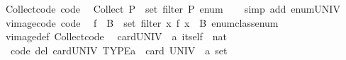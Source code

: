 \begin{isabellebody}
{}
\isamarkuptrue%
%
\isamarkuptrue%
%
\endisatagdocument
{\isafolddocument}%
%
\isadelimdocument
%
\endisadelimdocument
{}\isamarkupfalse%
\ Collect{\isacharunderscore}{\kern0pt}code\ {\isacharbrackleft}{\kern0pt}code{\isacharbrackright}{\kern0pt}{\isacharcolon}{\kern0pt}\isanewline
\ \ {\isachardoublequoteopen}Collect\ P\ {\isacharequal}{\kern0pt}\ set\ {\isacharparenleft}{\kern0pt}filter\ P\ enum{\isacharparenright}{\kern0pt}{\isachardoublequoteclose}\isanewline
%
\isadelimproof
\ \ %
\endisadelimproof
%
\isatagproof
{}\isamarkupfalse%
\ {\isacharparenleft}{\kern0pt}simp\ add{\isacharcolon}{\kern0pt}\ enum{\isacharunderscore}{\kern0pt}UNIV{\isacharparenright}{\kern0pt}%
\endisatagproof
{\isafoldproof}%
%
\isadelimproof
\isanewline
%
\endisadelimproof
\isanewline
{}\isamarkupfalse%
\ vimage{\isacharunderscore}{\kern0pt}code\ {\isacharbrackleft}{\kern0pt}code{\isacharbrackright}{\kern0pt}{\isacharcolon}{\kern0pt}\isanewline
\ \ {\isachardoublequoteopen}f\ {\isacharminus}{\kern0pt}{\isacharbackquote}{\kern0pt}\ B\ {\isacharequal}{\kern0pt}\ set\ {\isacharparenleft}{\kern0pt}filter\ {\isacharparenleft}{\kern0pt}{\isasymlambda}x{\isachardot}{\kern0pt}\ f\ x\ {\isasymin}\ B{\isacharparenright}{\kern0pt}\ enum{\isacharunderscore}{\kern0pt}class{\isachardot}{\kern0pt}enum{\isacharparenright}{\kern0pt}{\isachardoublequoteclose}\isanewline
%
\isadelimproof
\ \ %
\endisadelimproof
%
\isatagproof
{}\isamarkupfalse%
\ vimage{\isacharunderscore}{\kern0pt}def\ Collect{\isacharunderscore}{\kern0pt}code\ \isacommand{{\isachardot}{\kern0pt}{\isachardot}{\kern0pt}}\isamarkupfalse%
%
\endisatagproof
{\isafoldproof}%
%
\isadelimproof
\isanewline
%
\endisadelimproof
\isanewline
{}\isamarkupfalse%
\ card{\isacharunderscore}{\kern0pt}UNIV\ {\isacharcolon}{\kern0pt}{\isacharcolon}{\kern0pt}\ {\isachardoublequoteopen}{\isacharprime}{\kern0pt}a\ itself\ {\isasymRightarrow}\ nat{\isachardoublequoteclose}\isanewline
{}\isanewline
\ \ {\isacharbrackleft}{\kern0pt}code\ del{\isacharbrackright}{\kern0pt}{\isacharcolon}{\kern0pt}\ {\isachardoublequoteopen}card{\isacharunderscore}{\kern0pt}UNIV\ TYPE{\isacharparenleft}{\kern0pt}{\isacharprime}{\kern0pt}a{\isacharparenright}{\kern0pt}\ {\isacharequal}{\kern0pt}\ card\ {\isacharparenleft}{\kern0pt}UNIV\ {\isacharcolon}{\kern0pt}{\isacharcolon}{\kern0pt}\ {\isacharprime}{\kern0pt}a\ set{\isacharparenright}{\kern0pt}{\isachardoublequoteclose}\isanewline
\isanewline
{}\isamarkupfalse%

\end{isabellebody}

